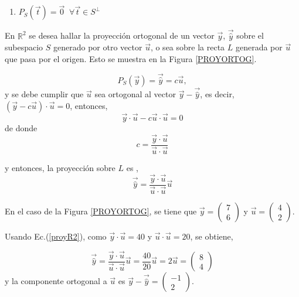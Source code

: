 {\begin{definition}
\begin{enumerate}
\bigskip

\item $P_S(\vec{t})=\vec{0} $  $ ~ \forall \vec{t}\in S^{\perp}$

\end{enumerate}

\end{definition}

\bigskip



\begin{example}
  En $\mathbb{R}^2$  se desea hallar la proyección ortogonal de un vector $\vec{y}$, $ \vec{\hat{y}}$  sobre el subespacio $S$  generado por otro vector $\vec{u} $, o sea sobre la recta $L$ generada por $\vec{u} $ que pasa por el origen. Esto se muestra en la Figura \ref{PROYORTOG}.

  $$P_S(\vec{y})= \vec{\hat{y}}= c \vec{u},$$ y se debe cumplir que $\vec{u} $ sea ortogonal al vector $ \vec{y} -\vec{\hat{y}}$, es decir, $ (\vec{y} -c \vec{u}) \cdot \vec{u}=0 $, entonces,
$$ \vec{y}  \cdot \vec{u} -c \vec{u} \cdot \vec{u}=0  $$
\noindent
  de donde 
  \[c= \frac{\vec{y}  \cdot \vec{u}}{\vec{u} \cdot \vec{u}}
  \]

\noindent
y entonces, la  proyección sobre $L$ es ,
  \begin{equation}
       \label{proyR2}
\vec{\hat{y}}=  \frac{\vec{y}  \cdot \vec{u}}{\vec{u} \cdot \vec{u}}\vec{u}
\end{equation}

  En el caso de la Figura \ref{PROYORTOG}, se tiene que 
  $ \vec{y}= \left(\begin{array}{c}  7  \\ 6
\end{array}
 \right)$  y $\vec{u}=   \left(\begin{array}{c}  4  \\ 2 
\end{array}
 \right).$
 
\bigskip

 Usando Ec.(\ref{proyR2}), como  $\vec{y}  \cdot \vec{u}=40$   y  $\vec{u}  \cdot \vec{u}=20$, se obtiene, 

\bigskip

\[\vec{\hat{y}}=  \frac{\vec{y}  \cdot \vec{u}}{\vec{u} \cdot \vec{u}}\vec{u}= \frac{40}{20}\vec{u}= 2 \vec{u}=\left(\begin{array}{c}  8  \\ 4
\end{array}
 \right)\]
\noindent
 y la componente ortogonal a $  \vec{u}$  es 
 $\vec{y}- \vec{\hat{y}} =\left(\begin{array}{c}  -1  \\ 2
\end{array}
 \right)   .$
 

\end{example}}

